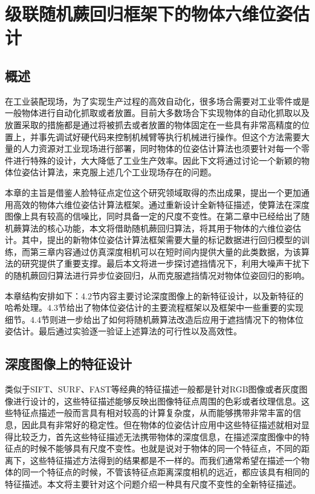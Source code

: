 \chapter{级联随机蕨回归框架下的物体六维位姿估计}

\section{概述}

在工业装配现场，为了实现生产过程的高效自动化，很多场合需要对工业零件或是一般物体进行自动化抓取或者放置。目前大多数场合下实现物体的自动化抓取以及放置采取的措施都是通过将被抓去或者放置的物体固定在一些具有非常高精度的位置上，并事先调试好硬代码来控制机械臂等执行机械进行操作。但这个方法需要大量的人力资源对工业现场进行部署，同时物体的位姿估计算法也须要针对每一个零件进行特殊的设计，大大降低了工业生产效率。因此下文将通过讨论一个新颖的物体位姿估计算法，来克服上述几个工业现场存在的问题。

本章的主旨是借鉴人脸特征点定位这个研究领域取得的杰出成果，提出一个更加通用高效的物体六维位姿估计算法框架。通过重新设计全新特征描述，使算法在深度图像上具有较高的信噪比，同时具备一定的尺度不变性。在第二章中已经给出了随机蕨算法的核心功能，本文将借助随机蕨回归算法，将其用于物体的六维位姿估计。其中，提出的新物体位姿估计算法框架需要大量的标记数据进行回归模型的训练，而第三章内容通过仿真深度相机可以在短时间内提供大量的此类数据，为该算法的研究提供了重要支撑。最后本文将进一步探讨遮挡情况下，利用大噪声干扰下的随机蕨回归算法进行异步位姿回归，从而克服遮挡情况对物体位姿回归的影响。

本章结构安排如下：4.2节内容主要讨论深度图像上的新特征设计，以及新特征的哈希处理。4.3节给出了物体位姿估计的主要流程框架以及框架中一些重要的实现细节。4.4节则进一步给出了如何将随机蕨算法改造后应用于遮挡情况下的物体位姿估计。最后通过实验逐一验证上述算法的可行性以及高效性。

\section{深度图像上的特征设计}

类似于SIFT、SURF、FAST等经典的特征描述一般都是针对RGB图像或者灰度图像进行设计的，这些特征描述能够反映出图像特征点周围的色彩或者纹理信息。这些特征点描述一般而言具有相对较高的计算复杂度，从而能够携带非常丰富的信息，因此具有非常好的稳定性。但在物体的位姿估计应用中这些特征描述就相对显得比较乏力，首先这些特征描述无法携带物体的深度信息，在描述深度图像中的特征点的时候不能够具有尺度不变性。也就是说对于物体的同一个特征点，不同的距离下，这些特征描述方法得到的结果都是不一样的。而我们通常希望在描述一个物体的同一个特征点的时候，不管该特征点距离深度相机的远近，都应该具有相同的特征描述。本文将主要针对这个问题介绍一种具有尺度不变性的全新特征描述。

